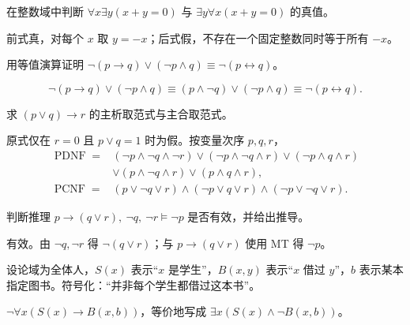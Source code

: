 \begin{exercise}[level=standard]
在整数域中判断 $\forall x\exists y(x+y=0)$ 与 $\exists y\forall x(x+y=0)$ 的真值。
\begin{solution}
前式真，对每个 $x$ 取 $y=-x$；后式假，不存在一个固定整数同时等于所有 $-x$。
\end{solution}
\end{exercise}

\begin{exercise}[level=standard]
用等值演算证明 $\neg(p\to q)\lor(\neg p\land q)\equiv\neg(p\leftrightarrow q)$。
\begin{solution}
\[
\neg(p\to q)\lor(\neg p\land q)
\equiv(p\land\neg q)\lor(\neg p\land q)
\equiv\neg(p\leftrightarrow q).
\]
\end{solution}
\end{exercise}

\begin{exercise}[level=standard]
求 $(p\lor q)\to r$ 的主析取范式与主合取范式。
\begin{solution}
原式仅在 $r=0$ 且 $p\lor q=1$ 时为假。按变量次序 $p,q,r$，
\[
\begin{aligned}
\operatorname{PDNF}={}&(\neg p\land\neg q\land\neg r)\lor
(\neg p\land\neg q\land r)\lor(\neg p\land q\land r)\\
&\lor(p\land\neg q\land r)\lor(p\land q\land r),\\
\operatorname{PCNF}={}&(p\lor\neg q\lor r)\land(\neg p\lor q\lor r)
\land(\neg p\lor\neg q\lor r).
\end{aligned}
\]
\end{solution}
\end{exercise}

\begin{exercise}[level=standard]
判断推理 $p\to(q\lor r),\ \neg q,\ \neg r\vDash\neg p$ 是否有效，并给出推导。
\begin{solution}
有效。由 $\neg q,\neg r$ 得 $\neg(q\lor r)$；与 $p\to(q\lor r)$ 使用 MT 得 $\neg p$。
\end{solution}
\end{exercise}

\begin{exercise}[level=standard]
设论域为全体人，$S(x)$ 表示“$x$ 是学生”，$B(x,y)$ 表示“$x$ 借过 $y$”，$b$ 表示某本指定图书。符号化：“并非每个学生都借过这本书”。
\begin{solution}
$\neg\forall x(S(x)\to B(x,b))$，等价地写成 $\exists x(S(x)\land\neg B(x,b))$。
\end{solution}
\end{exercise}

